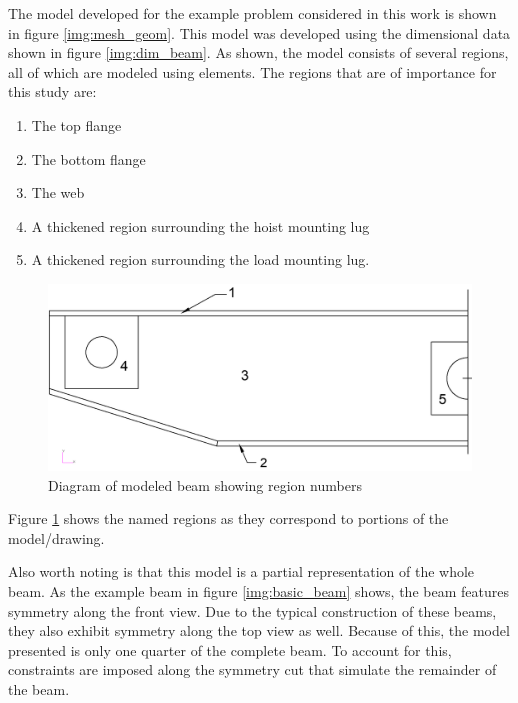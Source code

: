 The model developed for the example problem considered in this work is shown in figure \ref{img:mesh_geom}. This model was developed using the dimensional data shown in figure \ref{img:dim_beam}. As shown, the model consists of several regions, all of which are modeled using  elements. The regions that are of importance for this study are: 

\begin{enumerate}
  \item The top flange
  \item The bottom flange
  \item The web
  \item A thickened region surrounding the hoist mounting lug
  \item A thickened region surrounding the load mounting lug. 
\end{enumerate}

\begin{figure}
\includegraphics[width=\textwidth]{img/numbered_geom.png}
\caption{Diagram of modeled beam showing region numbers}
\label{img:num_geom}
\end{figure}

Figure \ref{img:num_geom} shows the named regions as they correspond to portions of the model/drawing. 

Also worth noting is that this model is a partial representation of the whole beam. As the example beam in figure \ref{img:basic_beam} shows, the beam features symmetry along the front view. Due to the typical construction of these beams, they also exhibit symmetry along the top view as well. Because of this, the model presented is only one quarter of the complete beam. To account for this, constraints are imposed along the symmetry cut that simulate the remainder of the beam. 

